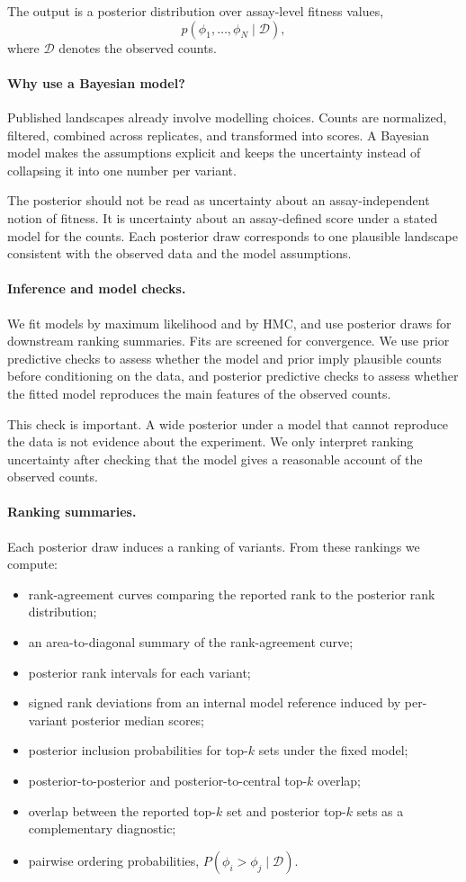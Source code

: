 \documentclass[11pt]{article}
\newcommand{\fit}{\phi}
\newcommand{\data}{\mathcal{D}}
\begin{document}
The output is a posterior distribution over assay-level fitness values,
\[
p(\fit_1,\ldots,\fit_N \mid \data),
\]
where $\data$ denotes the observed counts.

\paragraph{Why use a Bayesian model?}
Published landscapes already involve modelling choices. Counts are normalized, filtered, combined across replicates, and transformed into scores. A Bayesian model makes the assumptions explicit and keeps the uncertainty instead of collapsing it into one number per variant.

The posterior should not be read as uncertainty about an assay-independent notion of fitness. It is uncertainty about an assay-defined score under a stated model for the counts. Each posterior draw corresponds to one plausible landscape consistent with the observed data and the model assumptions.

\paragraph{Inference and model checks.}
We fit models by maximum likelihood and by HMC, and use posterior draws for downstream ranking summaries. Fits are screened for convergence. We use prior predictive checks to assess whether the model and prior imply plausible counts before conditioning on the data, and posterior predictive checks to assess whether the fitted model reproduces the main features of the observed counts.

This check is important. A wide posterior under a model that cannot reproduce the data is not evidence about the experiment. We only interpret ranking uncertainty after checking that the model gives a reasonable account of the observed counts.

\paragraph{Ranking summaries.}
Each posterior draw induces a ranking of variants. From these rankings we compute:
\begin{itemize}
  \item rank-agreement curves comparing the reported rank to the posterior rank distribution;
  \item an area-to-diagonal summary of the rank-agreement curve;
  \item posterior rank intervals for each variant;
  \item signed rank deviations from an internal model reference induced by per-variant posterior median scores;
  \item posterior inclusion probabilities for top-$k$ sets under the fixed model;
  \item posterior-to-posterior and posterior-to-central top-$k$ overlap;
  \item overlap between the reported top-$k$ set and posterior top-$k$ sets as a complementary diagnostic;
  \item pairwise ordering probabilities, $P(\fit_i > \fit_j \mid \data)$.
\end{itemize}
\end{document}
